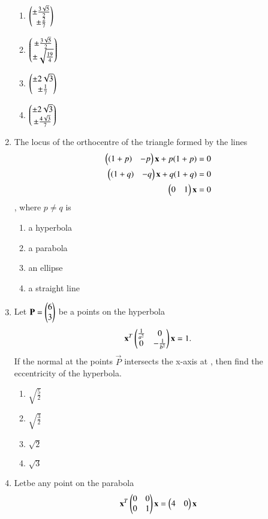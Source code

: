 \begin{enumerate}[label=\arabic*.,ref=\thesubsection.\theenumi]
    \begin{enumerate}
    \item $\begin{pmatrix}\pm\frac{3\sqrt{5}}{2}\\\pm\frac{2}{7}\end{pmatrix}$
    \item $\begin{pmatrix}\pm\frac{3\sqrt{5}}{2}\\ \pm\sqrt{\frac{19}{4}}\end{pmatrix}$
    \item $\begin{pmatrix}\pm 2\sqrt{3}\\ \pm\frac{1}{7}\end{pmatrix}$
    \item $\begin{pmatrix}\pm 2\sqrt{3}\\ \pm\frac{4\sqrt{3}}{7}\end{pmatrix}$
    \end{enumerate}
    \item The locus of the orthocentre of the triangle formed by the lines 
    \begin{align}
    \begin{pmatrix}(1+p)&-p\end{pmatrix}\mathbf{x}+p(1+p)=0\\
    \begin{pmatrix}(1+q)&-q\end{pmatrix}\mathbf{x}+q(1+q)=0\\
    \begin{pmatrix}0&1\end{pmatrix}\mathbf{x}=0
    \end{align}, where $p\neq q$ is 
    \begin{enumerate}
    \item a hyperbola
    \item a parabola
    \item an ellipse
    \item a straight line
    \end{enumerate}
    \item Let $\mathbf{P}=\begin{pmatrix}6\\3\end{pmatrix}$ be a points on the hyperbola 
    \begin{align}
    \mathbf{x}^T\begin{pmatrix}\frac{1}{a^2}&0\\0&-\frac{1}{b^2}\end{pmatrix}\mathbf{x} =1.
    \end{align} If the normal at the points $\vec{P}$ intersects the x-axis at , then find the eccentricity of the hyperbola.
    \begin{enumerate}
    \item $\sqrt{\frac{5}{2}}$
    \item $\sqrt{\frac{3}{2}}$
    \item $\sqrt{2}$
    \item  $\sqrt{3}$
    \end{enumerate}
    \item Letbe any point on the parabola 
    \begin{align} \vec{x}^T \myvec {0 & 0 \\0 & 1}\vec{x}=\myvec{4&0}\vec{x}

\end{align}
\end{enumerate}
